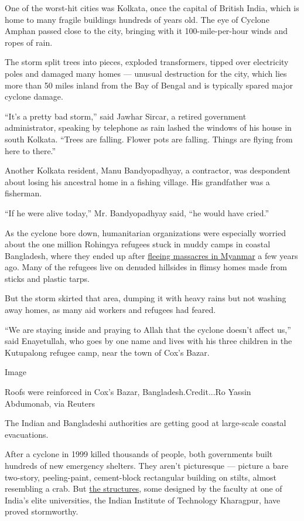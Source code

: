 One of the worst-hit cities was Kolkata, once the capital of British
India, which is home to many fragile buildings hundreds of years old.
The eye of Cyclone Amphan passed close to the city, bringing with it
100-mile-per-hour winds and ropes of rain.

The storm split trees into pieces, exploded transformers, tipped over
electricity poles and damaged many homes --- unusual destruction for the
city, which lies more than 50 miles inland from the Bay of Bengal and is
typically spared major cyclone damage.

``It's a pretty bad storm,'' said Jawhar Sircar, a retired government
administrator, speaking by telephone as rain lashed the windows of his
house in south Kolkata. ``Trees are falling. Flower pots are falling.
Things are flying from here to there.''

Another Kolkata resident, Manu Bandyopadhyay, a contractor, was
despondent about losing his ancestral home in a fishing village. His
grandfather was a fisherman.

``If he were alive today,'' Mr. Bandyopadhyay said, ``he would have
cried.''

As the cyclone bore down, humanitarian organizations were especially
worried about the one million Rohingya refugees stuck in muddy camps in
coastal Bangladesh, where they ended up after
\href{https://www.nytimes.com/2017/10/11/world/asia/rohingya-myanmar-atrocities.html}{fleeing
massacres in Myanmar} a few years ago. Many of the refugees live on
denuded hillsides in flimsy homes made from sticks and plastic tarps.

But the storm skirted that area, dumping it with heavy rains but not
washing away homes, as many aid workers and refugees had feared.

``We are staying inside and praying to Allah that the cyclone doesn't
affect us,'' said Enayetullah, who goes by one name and lives with his
three children in the Kutupalong refugee camp, near the town of Cox's
Bazar.

Image

Roofs were reinforced in Cox's Bazar, Bangladesh.Credit...Ro Yassin
Abdumonab, via Reuters

The Indian and Bangladeshi authorities are getting good at large-scale
coastal evacuations.

After a cyclone in 1999 killed thousands of people, both governments
built hundreds of new emergency shelters. They aren't picturesque ---
picture a bare two-story, peeling-paint, cement-block rectangular
building on stilts, almost resembling a crab. But
\href{https://www.telegraphindia.com/states/west-bengal/iit-kharagpur-professors-behind-life-saver-shelters/cid/1690016}{the
structures}, some designed by the faculty at one of India's elite
universities, the Indian Institute of Technology Kharagpur, have proved
stormworthy.

